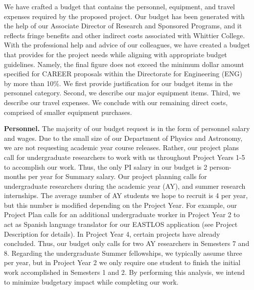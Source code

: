 \documentclass[10pt]{amsart}
\theoremstyle{definition}
\numberwithin{equation}{section}
\begin{document}
We have crafted a budget that contains the personnel, equipment, and travel expenses required by the proposed project.  Our budget has been generated with the help of our Associate Director of Research and Sponsored Programs, and it reflects fringe benefits and other indirect costs associated with Whittier College.  With the professional help and advice of our colleagues, we have created a budget that provides for the project needs while aligning with appropriate budget guidelines.  Namely, the final figure does not exceed the minimum dollar amount specified for CAREER proposals within the Directorate for Engineering (ENG) by more than 10\%.  We first provide justification for our budget items in the personnel category.  Second, we describe our major equipment items.  Third, we describe our travel expenses.  We conclude with our remaining direct costs, comprised of smaller equipment purchases.  

\textbf{Personnel.}  The majority of our budget request is in the form of personnel salary and wages.  Due to the small size of our Department of Physics and Astronomy, we are not requesting academic year course releases.  Rather, our project plans call for undergraduate researchers to work with us throughout Project Years 1-5 to accomplish our work.  Thus, the only PI salary in our budget is 2 person-months per year for Summary salary.  Our project planning calls for undergraduate researchers during the academic year (AY), and summer research internships.  The average number of AY students we hope to recruit is 4 per year, but this number is modified depending on the Project Year.  For example, our Project Plan calls for an additional undergraduate worker in Project Year 2 to act as Spanish language translator for our EASTLOS application (see Project Description for details).  In Project Year 4, certain projects have already concluded.  Thus, our budget only calls for two AY researchers in Semesters 7 and 8.  Regarding the undergraduate Summer fellowships, we typically assume three per year, but in Project Year 2 we only require one student to finish the initial work accomplished in Semesters 1 and 2.  By performing this analysis, we intend to minimize budgetary impact while completing our work. 
\end{document}
